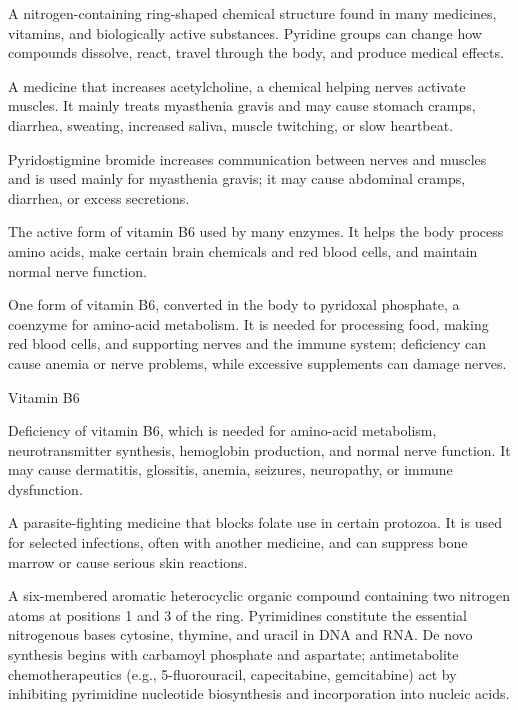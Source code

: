 A nitrogen-containing ring-shaped chemical structure found in many medicines, vitamins, and biologically active substances. Pyridine groups can change how compounds dissolve, react, travel through the body, and produce medical effects.

 A medicine that increases acetylcholine, a chemical helping nerves activate muscles. It mainly treats myasthenia gravis and may cause stomach cramps, diarrhea, sweating, increased saliva, muscle twitching, or slow heartbeat.

 Pyridostigmine bromide increases communication between nerves and muscles and is used mainly for myasthenia gravis; it may cause abdominal cramps, diarrhea, or excess secretions.

 The active form of vitamin B6 used by many enzymes. It helps the body process amino acids, make certain brain chemicals and red blood cells, and maintain normal nerve function.

 One form of vitamin B6, converted in the body to pyridoxal phosphate, a coenzyme for amino-acid metabolism. It is needed for processing food, making red blood cells, and supporting nerves and the immune system; deficiency can cause anemia or nerve problems, while excessive supplements can damage nerves.

\synonyms
Vitamin B6

 Deficiency of vitamin B6, which is needed for amino-acid metabolism, neurotransmitter synthesis, hemoglobin production, and normal nerve function. It may cause dermatitis, glossitis, anemia, seizures, neuropathy, or immune dysfunction.

 A parasite-fighting medicine that blocks folate use in certain protozoa. It is used for selected infections, often with another medicine, and can suppress bone marrow or cause serious skin reactions.

 A six-membered aromatic heterocyclic organic compound containing two nitrogen atoms at positions 1 and 3 of the ring. Pyrimidines constitute the essential nitrogenous bases cytosine, thymine, and uracil in DNA and RNA. De novo synthesis begins with carbamoyl phosphate and aspartate; antimetabolite chemotherapeutics (e.g., 5-fluorouracil, capecitabine, gemcitabine) act by inhibiting pyrimidine nucleotide biosynthesis and incorporation into nucleic acids.

